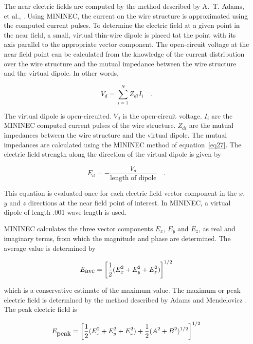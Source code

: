 \documentclass[12pt]{article}
\begin{document}
The near electric fields are computed by the method described by
A.~T. Adams, et al., \cite{r12}. Using MININEC, the current
on the wire structure is approximated using the computed current pulses.
To determine the electric field at a given point in the near field, a
small, virtual thin-wire dipole is placed tat the point with its axis
parallel to the appropriate vector component. The open-circuit voltage
at the near field point can be calculated from the knowledge of the
current distribution over the wire structure and the mutual impedance
between the wire structure and the virtual dipole. In other words,

\begin{equation}
V_d = \sum_{i=1}^{N}Z_{di}I_i \quad.
\label{eq32}
\end{equation}

The virtual dipole is open-circuited. $V_d$ is the open-circuit voltage.
$I_i$ are the MININEC computed current pulses of the wire structure.
$Z_{di}$ are the mutual impedances between the wire structure and the
virtual dipole. The mutual impedances are calculated using the MININEC
method of equation~\eqref{eq27}. The electric field strength along the
direction of the virtual dipole is given by

\begin{equation}
E_d = -\frac{V_d}{\mbox{length of dipole}}\quad.
\label{eq33}
\end{equation}

This equation is evaluated once for each electric field vector component
in the $x$, $y$ and $z$ directions at the near field point of interest.
In MININEC, a virtual dipole of length .001 wave length is used.

MININEC calculates the three vector components $E_x$, $E_y$ and $E_z$,
as real and imaginary terms, from which the magnitude and phase are
determined. The average value is determined by

\begin{equation}
E_{\mbox{ave}} = \left[\frac{1}{2}(E_x^2+E_y^2+E_z^2)\right]^{1/2}
\label{eq34}
\end{equation}

\noindent which is a conservative estimate of the maximum value. The maximum or
peak electric field is determined by the method described by Adams and
Mendelovicz \cite{r13}. The peak electric field is

\begin{equation}
E_{\mbox{peak}} = \left[\frac{1}{2}(E_x^2+E_y^2+E_z^2)
                +\frac{1}{2}(A^2+B^2)^{1/2} \right]^{1/2}
\label{eq35}
\end{equation}
\end{document}
